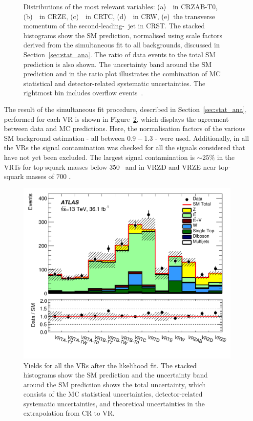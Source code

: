 \begin{figure}[!htb]
		    \caption{Distributions of the most relevant variables: (a)~\mttwoprime\ in CRZAB-T0, (b)~\metprime\ in CRZE, (c)~\rISR\ in CRTC, (d)~\mtbmax\ in CRW, (e)~the transverse momentum of the second-leading-\pT\ jet in CRST. The stacked histograms show the \ac{SM} prediction, normalised using scale factors derived from the simultaneous fit to all backgrounds, discussed in Section~\ref{sec:stat_ana}. The ratio of data events to the total \ac{SM} prediction is also shown. The uncertainty band around the \ac{SM} prediction and in the ratio plot illustrates the combination of \ac{MC} statistical and detector-related systematic uncertainties. The rightmost bin includes overflow events~\cite{stop0L}.}
		    \label{fig:CRs}
			\end{figure}

			The result of the simultaneous fit procedure, described in Section~\ref{sec:stat_ana}, performed for each \ac{VR} is shown in Figure~\ref{fig:VRs}, which displays the agreement between data and \ac{MC} predictions. Here, the normalisation factors of the various \ac{SM} background estimation - all between $0.9 - 1.3$ - were used. Additionally, in all the \acp{VR} the signal contamination was checked for all the signals considered that have not yet been excluded. The largest signal contamination is $\sim 25\%$ in the VRTs for top-squark masses below $350$ \GeV\ and in VRZD and VRZE near top-squark masses of $700$ \GeV.

			\begin{figure}[!htb]
			  \begin{center}
			    \includegraphics[width=.8\textwidth]{figures/stop/regionSummaryVR}
			    \caption{Yields for all the \acp{VR} after the likelihood fit. The stacked histograms show the \ac{SM} prediction and the uncertainty band around the \ac{SM} prediction shows the total uncertainty, which consists of the \ac{MC} statistical uncertainties, detector-related systematic uncertainties, and theoretical uncertainties in the extrapolation from \ac{CR} to \ac{VR}.} 
			    \label{fig:VRs}
			  \end{center}
			\end{figure}


